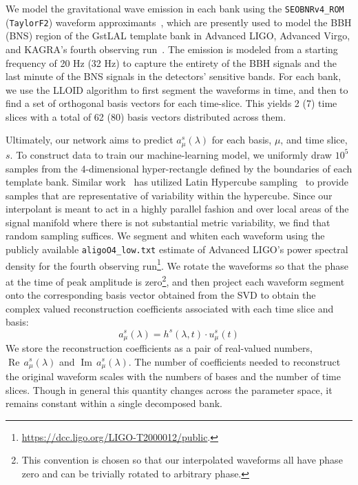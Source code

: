 \documentclass[twocolumn,prd,superscriptaddress,nofootinbib]{revtex4-1}
\begin{document}
We model the gravitational wave emission in each bank using the \texttt{SEOBNRv4\_ROM}
(\texttt{TaylorF2}) waveform approximants~\cite{Bohe:2016gbl,Blanchet:1995ez}, which are presently used to model the BBH (BNS) region of the GstLAL template bank in Advanced LIGO, Advanced Virgo, and KAGRA's fourth observing run~\cite{Sakon:2022ibh}. The emission is modeled 
from a starting frequency of 20 Hz (32 Hz) to capture the entirety of the BBH signals and the last minute of the BNS
signals in the detectors' sensitive bands. For each bank, we use the LLOID algorithm to first
segment the waveforms in time, and then to find a set of orthogonal basis
vectors for each time-slice.  This yields 2 (7) time slices with a total of 62
(80) basis vectors distributed across them. 

Ultimately, our network aims to predict $a_\mu^s(\lambda)$ for each basis,
$\mu$, and time slice, $s$. To construct data to train our machine-learning
model, we uniformly draw $10^5$ samples from the 4-dimensional hyper-rectangle
defined by the boundaries of each template bank.  Similar
work~\cite{Wong:2020wvd} has utilized Latin Hypercube
sampling~\cite{OLSSON200347} to provide samples that are representative
of variability within the hypercube. Since our interpolant is meant to act in a
highly parallel fashion and over local areas of the signal manifold where there
is not substantial metric variability, we find that
random sampling suffices. We segment and whiten each waveform using the publicly
available \texttt{aligoO4\_low.txt} estimate of Advanced LIGO's power spectral density for the fourth
observing run\footnote{\href{https://dcc.ligo.org/LIGO-T2000012/public}{https://dcc.ligo.org/LIGO-T2000012/public}.}.
We rotate the waveforms so that the phase at the time of peak amplitude is zero\footnote{This convention is chosen so that our interpolated waveforms all have phase zero and can be trivially rotated to arbitrary phase.},
and then project each waveform segment onto the corresponding basis vector
obtained from the SVD to obtain the complex valued reconstruction coefficients
associated with each time slice and basis:
%
\begin{equation} a_\mu^{s}(\lambda) = h^{s}(\lambda,t) \cdot u_\mu^{s}(t) \end{equation}
%
We store the reconstruction coefficients as a pair of real-valued numbers, $\operatorname{Re}\,
a_\mu^{s}(\lambda)$ and $\operatorname{Im}\, a_\mu^{s}(\lambda)$. The number of coefficients
needed to reconstruct the original waveform scales with the
numbers of bases and the
number of time slices. Though in general this quantity changes
across the parameter space, it remains constant within a single
decomposed bank. 
\end{document}
